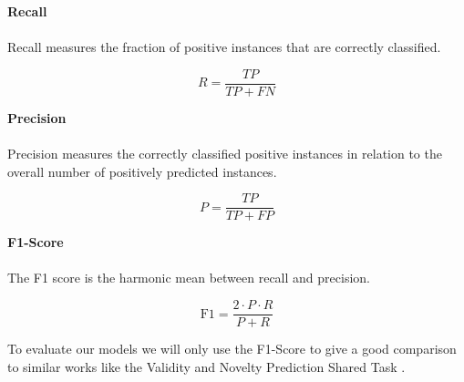 \textbf{Recall} \\ \\
Recall measures the fraction of positive instances that are correctly classified.

\begin{equation}
	R = \frac{TP}{TP + FN}
\end{equation}

\textbf{Precision} \\ \\
Precision measures the correctly classified positive instances in relation to the overall number of positively predicted instances.

\begin{equation}
	P = \frac{TP}{TP + FP}
\end{equation}

\textbf{F1-Score} \\ \\
The F1 score is the harmonic mean between recall and precision.

\begin{equation}
	\text{F1} = \frac{2 \cdot P \cdot R}{P + R}
\end{equation}

To evaluate our models we will only use the F1-Score to give a good comparison to similar works like the Validity and Novelty Prediction Shared Task \cite{argsvalidnovel2022}.